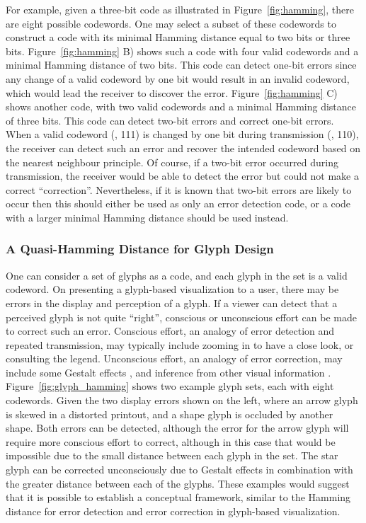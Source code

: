For example, given a three-bit code as illustrated in Figure~\ref{fig:hamming}, there are eight possible codewords.
One may select a subset of these codewords to construct a code with its minimal Hamming distance equal to two bits or three bits.
Figure~\ref{fig:hamming} B) shows such a code with four valid codewords and a minimal Hamming distance of two bits.
This code can detect one-bit errors since any change of a valid codeword by one bit would result in an invalid codeword, which would lead the receiver to discover the error.
Figure~\ref{fig:hamming} C) shows another code, with two valid codewords and a minimal Hamming distance of three bits.
This code can detect two-bit errors and correct one-bit errors.
When a valid codeword (\eg, 111) is changed by one bit during transmission (\eg, 110), the receiver can detect such an error and recover the intended codeword based on the nearest neighbour principle.
Of course, if a two-bit error occurred during transmission, the receiver would be able to detect the error but could not make a correct ``correction''.
Nevertheless, if it is known that two-bit errors are likely to occur then this should either be used as only an error detection code, or a code with a larger minimal Hamming distance should be used instead.

\subsubsection{A Quasi-Hamming Distance for Glyph Design}
\label{sec:qhd}

One can consider a set of glyphs as a code, and each glyph in the set is a valid codeword.
On presenting a glyph-based visualization to a user, there may be errors in the display and perception of a glyph.
If a viewer can detect that a perceived glyph is not quite ``right'', conscious or unconscious effort can be made to correct such an error.
Conscious effort, an analogy of error detection and repeated transmission, may typically include zooming in to have a close look, or consulting the legend.
Unconscious effort, an analogy of error correction, may include some Gestalt effects \cite{Chen:2014:CGF}, and inference from other visual information \cite{Rheingans:1995:PIV}.
Figure~\ref{fig:glyph_hamming} shows two example glyph sets, each with eight codewords.
Given the two display errors shown on the left, where an arrow glyph is skewed in a distorted printout, and a shape glyph is occluded by another shape.
Both errors can be detected, although the error for the arrow glyph will require more conscious effort to correct, although in this case that would be impossible due to the small distance between each glyph in the set. 
The star glyph can be corrected unconsciously due to Gestalt effects in combination with the greater distance between each of the glyphs.
These examples would suggest that it is possible to establish a conceptual framework, similar to the Hamming distance for error detection and error correction in glyph-based visualization.


